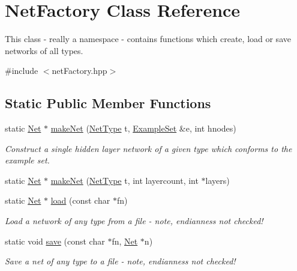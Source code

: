 \hypertarget{classNetFactory}{}\section{Net\+Factory Class Reference}
\label{classNetFactory}


This class -\/ really a namespace -\/ contains functions which create, load or save networks of all types.  




{\ttfamily \#include $<$net\+Factory.\+hpp$>$}

\subsection*{Static Public Member Functions}
\begin{DoxyCompactItemize}
\item 
static \hyperlink{classNet}{Net} $\ast$ \hyperlink{classNetFactory_abee207e81a04a7abf08e1f50bc2fe000}{make\+Net} (\hyperlink{netType_8hpp_a1526df0fc932ccf720aa26267f923213}{Net\+Type} t, \hyperlink{classExampleSet}{Example\+Set} \&e, int hnodes)
\begin{DoxyCompactList}\small\item\em Construct a single hidden layer network of a given type which conforms to the example set. \end{DoxyCompactList}\item 
static \hyperlink{classNet}{Net} $\ast$ \hyperlink{classNetFactory_acfea78d60ab00b1921e4abc83dcb774e}{make\+Net} (\hyperlink{netType_8hpp_a1526df0fc932ccf720aa26267f923213}{Net\+Type} t, int layercount, int $\ast$layers)
\item 
static \hyperlink{classNet}{Net} $\ast$ \hyperlink{classNetFactory_a58df46a362afbe6739a49c07fac08455}{load} (const char $\ast$fn)
\begin{DoxyCompactList}\small\item\em Load a network of any type from a file -\/ note, endianness not checked! \end{DoxyCompactList}\item 
static void \hyperlink{classNetFactory_ae31873d8b18faf8a2af58772d171bc97}{save} (const char $\ast$fn, \hyperlink{classNet}{Net} $\ast$n)
\begin{DoxyCompactList}\small\item\em Save a net of any type to a file -\/ note, endianness not checked! \end{DoxyCompactList}\end{DoxyCompactItemize}


